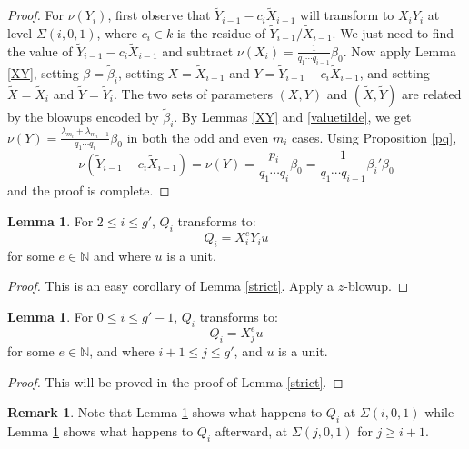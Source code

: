 \documentclass[11pt]{amsart}
\theoremstyle{definition}
\newtheorem{lem}[thm]{Lemma}
\newtheorem*{rem}{Remark}
\begin{document}
{\begin{proof}
For $\nu(Y_i)$, first observe that $\tilde Y_{i-1}-c_i\tilde X_{i-1}$ will transform to $X_iY_i$ at level $\Sigma(i,0,1)$, where $c_i\in k$ is the residue of $\tilde Y_{i-1}/\tilde X_{i-1}$. We just need to find the value of $\tilde Y_{i-1}-c_i\tilde X_{i-1}$ and subtract $\nu(X_i)=\frac{1}{q_1\cdots q_{i-1}}\beta_0$. Now apply Lemma \ref{XY}, setting $\beta=\tilde \beta_i$, setting $X=\tilde X_{i-1}$ and $Y=\tilde Y_{i-1}-c_i\tilde X_{i-1}$, and setting $\tilde X = \tilde X_i$ and $\tilde Y= \tilde Y_i$. The two sets of parameters $(X,Y)$ and $(\tilde X,\tilde Y)$ are related by the blowups encoded by $\tilde \beta_i$. By Lemmas \ref{XY} and \ref{valuetilde}, we get $\displaystyle \nu(Y)=\frac{\lambda_{m_i}+\lambda_{m_i-1}}{q_1\cdots q_i}\beta_0$ in both the odd and even $m_i$ cases. Using Proposition \ref{pq},
\begin{equation*}
\nu\left(\tilde Y_{i-1}-c_i\tilde X_{i-1}\right)=\nu(Y)=\frac{p_i}{q_1\cdots q_i}\beta_0=\frac{1}{q_1\cdots q_{i-1}} \beta_i' \beta_0
\end{equation*}
and the proof is complete.
\end{proof}

\begin{lem} \label{leveli}
For $2\leq i\leq g'$, $Q_i$ transforms to:
\begin{equation*}
Q_i=X_{i}^eY_{i}u
\end{equation*}
for some $e\in\mathbb{N}$ and where $u$ is a unit.
\end{lem}
\begin{proof}
This is an easy corollary of Lemma \ref{strict}. Apply a $z$-blowup.
\end{proof}

\begin{lem} \label{leveli+}
For $0\leq i\leq g'-1$, $Q_i$ transforms to:
\begin{equation*}
Q_i=X_{j}^eu
\end{equation*}
for some $e\in\mathbb{N}$, and where $i+1\leq j\leq g'$, and $u$ is a unit.
\end{lem}

\begin{proof}
This will be proved in the proof of Lemma \ref{strict}.
\end{proof}
\begin{rem}
Note that Lemma \ref{leveli} shows what happens to $Q_i$ at $\Sigma(i,0,1)$ while Lemma \ref{leveli+} shows what happens to $Q_i$ afterward, at $\Sigma(j,0,1)$ for $j\geq i+1$.
\end{rem}

}
\end{document}

